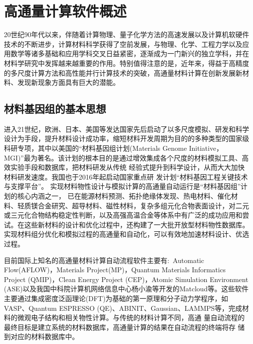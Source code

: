 \chapter{高通量计算软件概述}\label{chap:Software} 
20世纪90年代以来，伴随着计算物理、量子化学方法的高速发展以及计算机软硬件技术的不断进步，计算材料科学获得了空前发展，与物理、化学、工程力学以及应用数学等诸多基础和应用学科交叉日益紧密，逐渐成为一门新兴的独立学科，并在材料学研究中发挥越来越重要的作用。\cite{Nat-Mat3-429_2004,App-CataA5-254_2003,JACS125-4306_2003,JCC5-472_2003,Mater_Sci-Tech16-1_2005,Nature392-694_1998}特别值得注意的是，近年来，得益于高精度的多尺度计算方法和高性能并行计算技术的突破，\cite{PRL88-255506_2002,Nano-Lett3-1183_2003}高通量材料计算在创新发展新材料、发现新现象方面具有巨大的潜能。

\section{材料基因组的基本思想}
进入21世纪，欧洲、日本、美国等发达国家先后启动了以多尺度模拟、研发和科学设计为手段，提升材料设计成功率，缩短材料开发周期为目的的多种类型的国家级科研专项，其中以美国的“材料基因组计划\textrm{(Materials Genome Initiative， MGI)}”最为著名\cite{MGI_USA}。该计划的根本目的是通过增效集成各个尺度的材料模拟工具、高效实验手段和数据库，把材料研发从传统 经验式提升到科学设计，从而大大加快材料研发速度。我国也于2016年起启动国家重点研 发计划“材料基因工程关键技术与支撑平台”。 实现材料物性设计与模拟计算的高通量自动运行是“材料基因组”计划的核心内涵之一， 已在能源材料预测\cite{PRL108-068701_2012}、拓扑绝缘体发现\cite{RMP82-3045_2010}、热电材料\cite{JACS128-12140_2006}、催化材料\cite{ACIE46-6016_2007}、轻质镁合金研究\cite{PRB84-084101_2011}、超导材料\cite{PRL105-217003_2010}、磁性材料\cite{Nat-Mat10-158_2011,JPD40-R337_2007}，复杂多组元化合物表面设计\cite{Science316-732_2007,ACSNano5-247_2011}，对二元或三元化合物结构稳定性判断\cite{PRB85-144116_2012}，以及高强高温合金等体系中有广泛的成功应用和尝试。在这些新材料的设计和优化过程中，还构建了一大批开放型材料物性数据库。 实现材料组分优化和模拟过程的高通量和自动化，可以有效地加速材料设计、优选过程。

目前国际上知名的高通量材料计算自动流程软件主要有:~\textrm{Automatic Flow(AFLOW)}\cite{CMS49-299_2010}，\textrm{Materials Project(MP)}\cite{CMS50-2295_2011}，\textrm{Quantum Materials Informatics Project (QMIP)}\cite{QMIP_URL}，\textrm{Clean Energy Project (CEP)}\cite{JPCL2-2241_2011}，\textrm{Atomic Simulation Environment (ASE)}\cite{JPCM29-273002_2017}以及我国中科院计算机网络信息中心杨小渝等开发的\textrm{Matcloud}\cite{CMS146-319_2018}等。这些软件主要通过集成密度泛函理论\textrm{(DFT)}为基础的第一原理和分子动力学程序，如\textrm{VASP}\cite{VASP_manual}、\textrm{Quantum ESPRESSO (QE)}\cite{JPCM21-395502_2009}、\textrm{ABINIT}\cite{CPC180-2582_2009}、\textrm{Gaussian}\cite{Gaussian-UG_2004}、\textrm{LAMMPS}\cite{JCP117-1_1995}等，完成材料的微观电子结构和相关物性计算。与传统的材料计算不同，高通 量自动流程的最终目标是建立系统的材料数据库，高通量计算的结果在自动流程的终端将存 储到对应的材料数据库中。

